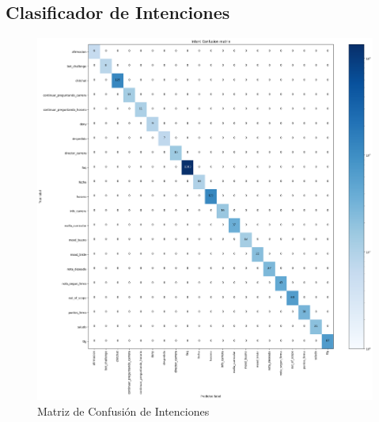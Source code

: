 \subsection{Clasificador de Intenciones}

\begin{figure}[h!]
    \centering
    \includegraphics[width=\textwidth]{imagenes/cap5/intent_confusion_matrix.png}   
    \caption{Matriz de Confusión de Intenciones}
    \label{fig:intent_matriz}
\end{figure}

